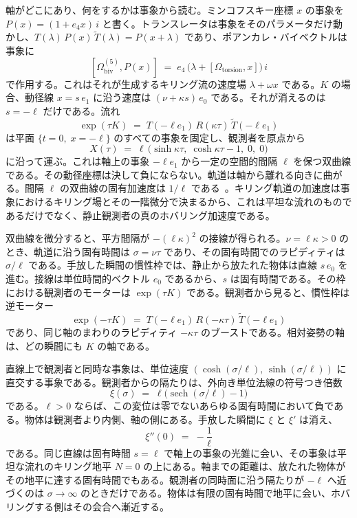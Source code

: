 \documentclass[a4paper]{article}
\begin{document}
軸がどこにあり、何をするかは事象から読む。ミンコフスキー座標 \(x\) の事象を \(P(x)=(1+e_{4}x)\,i\) と書く。トランスレータは事象をそのパラメータだけ動かし、\(T(\lambda)\,P(x)\,\widetilde{T}(\lambda)=P(x+\lambda)\) であり、ポアンカレ・バイベクトルは事象に
\[
[\Omega_{\mathrm{biv}}^{(5)},P(x)] \;=\; e_{4}\,\bigl(\lambda+[\Omega_{\mathrm{torsion}},x]\bigr)\,i
\]
で作用する。これはそれが生成するキリング流の速度場 \(\lambda+\omega x\) である。\(K\) の場合、動径線 \(x=s\,e_{1}\) に沿う速度は \((\nu+\kappa s)\,e_{0}\) である。それが消えるのは \(s=-\ell\) だけである。流れ
\[
\exp(\tau K) \;=\; T(-\ell e_{1})\,R(\kappa\tau)\,\widetilde{T}(-\ell e_{1})
\]
は平面 \(\{t=0,\;x=-\ell\}\) のすべての事象を固定し、観測者を原点から
\[
X(\tau) \;=\; \ell\,\bigl(\sinh\kappa\tau,\;\cosh\kappa\tau-1,\;0,\;0\bigr)
\]
に沿って運ぶ。これは軸上の事象 \(-\ell e_{1}\) から一定の空間的間隔 \(\ell\) を保つ双曲線である。その動径座標は決して負にならない。軌道は軸から離れる向きに曲がる。間隔 \(\ell\) の双曲線の固有加速度は \(1/\ell\) である~\cite{Rindler1966}。キリング軌道の加速度は事象におけるキリング場とその一階微分で決まるから、これは平坦な流れのものであるだけでなく、静止観測者の真のホバリング加速度である。

双曲線を微分すると、平方間隔が \(-(\ell\kappa)^{2}\) の接線が得られる。\(\nu=\ell\kappa>0\) のとき、軌道に沿う固有時間は \(\sigma=\nu\tau\) であり、その固有時間でのラピディティは \(\sigma/\ell\) である。手放した瞬間の慣性枠では、静止から放たれた物体は直線 \(s\,e_{0}\) を進む。接線は単位時間的ベクトル \(e_{0}\) であるから、\(s\) は固有時間である。その枠における観測者のモーターは \(\exp(\tau K)\) である。観測者から見ると、慣性枠は逆モーター
\[
\exp(-\tau K) \;=\; T(-\ell e_{1})\,R(-\kappa\tau)\,\widetilde{T}(-\ell e_{1})
\]
であり、同じ軸のまわりのラピディティ \(-\kappa\tau\) のブーストである。相対姿勢の軸は、どの瞬間にも \(K\) の軸である。

直線上で観測者と同時な事象は、単位速度 \((\cosh(\sigma/\ell),\,\sinh(\sigma/\ell))\) に直交する事象である。観測者からの隔たりは、外向き単位法線の符号つき倍数
\begin{equation}
\xi(\sigma) \;=\; \ell\bigl(\operatorname{sech}(\sigma/\ell)-1\bigr)
\label{eq:fall-displacement}
\end{equation}
である。\(\ell>0\) ならば、この変位は零でないあらゆる固有時間において負である。物体は観測者より内側、軸の側にある。手放した瞬間に \(\xi\) と \(\xi'\) は消え、
\[
\xi''(0) \;=\; -\frac{1}{\ell}
\]
である。同じ直線は固有時間 \(s=\ell\) で軸上の事象の光錐に会い、その事象は平坦な流れのキリング地平 \(N=0\) の上にある。軸までの距離は、放たれた物体がその地平に達する固有時間でもある。観測者の同時面に沿う隔たりが \(-\ell\) へ近づくのは \(\sigma\to\infty\) のときだけである。物体は有限の固有時間で地平に会い、ホバリングする側はその会合へ漸近する。
\end{document}
